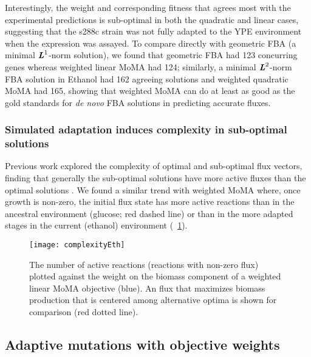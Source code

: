 Interestingly, the weight and corresponding fitness that agrees most
with the experimental predictions is sub-optimal in both the quadratic
and linear cases, suggesting that the s288c strain was not fully
adapted to the YPE environment when the expression was assayed.  To
compare directly with geometric FBA (a minimal $\textbf{\textit{L}}^1$-norm solution), we found
that geometric FBA had 123 concurring genes whereas weighted linear
MoMA had 124; similarly, a minimal $\textbf{\textit{L}}^2$-norm FBA solution in Ethanol had 162
agreeing solutions and weighted quadratic MoMA had 165, showing that
weighted MoMA can do at least as good as the gold standards for \textit{de
novo} FBA solutions in predicting accurate fluxes.


\subsubsection{Simulated adaptation induces complexity in sub-optimal solutions}

Previous work explored the complexity of optimal and sub-optimal flux
vectors, finding that generally the sub-optimal solutions have more
active fluxes than the optimal solutions \citep{SangLee2012}. We found
a similar trend with weighted MoMA where, once growth is non-zero, the initial flux state
has more active reactions than in the ancestral environment (glucose;
red dashed line) or than in the more adapted stages in the current
(ethanol) environment (\Fig~\ref{fig:complexityEth}).


\begin{figure}
\centering
  \texttt{[image: complexityEth]}
  \caption{The number of active reactions (reactions with non-zero
  flux) plotted against the weight on the biomass component of a
  weighted linear MoMA objective (blue). An flux that maximizes biomass
  production that is centered among alternative optima is shown for
  comparison (red dotted line).}
  \label{fig:complexityEth}
\end{figure}


\subsection{Adaptive mutations with objective weights}


